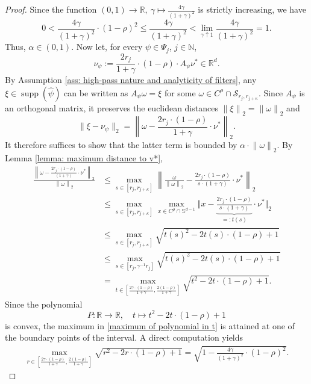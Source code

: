\documentclass[11pt]{amsart}
\newcommand{\R}{{\mathbb{R}}}
\newcommand{\N}{\mathbb{N}}
\newcommand{\s}{\mathcal{S}}
\newcommand{\norm}[1]{\ensuremath{\left\lVert\text{}#1\text{}\right\rVert}}
\DeclareMathOperator{\supp}{supp}
\newenvironment{proof sketch} {\textit{Proof sketch.}}{}
\begin{document}
  \begin{proof}
    Since the function $(0,1)\to \R, \ \gamma \mapsto \frac{4\gamma}{(1+\gamma)^2}$ is strictly increasing, we have
    \[0<\frac{4\gamma}{(1+\gamma)^2}\cdot (1-\rho)^2\leq\frac{4\gamma}{(1+\gamma)^2}<\lim_{\gamma \uparrow 1} \frac{4\gamma}{(1+\gamma)^2}= 1.\] 
    Thus, $\alpha \in (0,1)$.
    Now let, for every $\psi \in \Psi_j$, $j \in \N$,
    \[\nu_{\psi}:=\frac{2r_{j}}{1+\gamma} \cdot (1-\rho)\cdot A_{\psi}\nu^* \in \R^d.\]
    By Assumption \ref{ass: high-pass nature and analyticity of filters}, any $\xi \in \supp(\widehat{\psi})$ can be written as $A_{\psi}\omega = \xi$ for some $\omega \in C^\rho \cap \s_{r_{j},r_{j+\kappa}}$. Since $A_{\psi}$ is an orthogonal matrix, it preserves the euclidean distances $\norm{\xi}_2=\norm{\omega}_2$ and
    \[\|\xi-\nu_{\psi}\|_2=\norm{\omega-\frac{2r_{j} \cdot (1-\rho)}{1+\gamma}\cdot \nu^*}_2.\] 
    It therefore suffices to show that the latter term is bounded by $\alpha \cdot \norm{\omega}_2$. By Lemma \ref{lemma: maximum distance to v*},
    \begin{align}
      \frac{\norm{\omega-\frac{2r_{j} \cdot (1-\rho)}{(1+\gamma)}\cdot \nu^*}_2}{\norm{\omega}_2} 
      &\leq \max_{s \in [r_{j}, r_{j+\kappa}]}\norm{\frac{\omega}{\norm{\omega}_2}-\frac{2r_{j} \cdot (1-\rho)}{s \cdot (1+\gamma)}\cdot \nu^*}_2 \nonumber\\
      &\leq  \max_{s \in [r_{j},r_{j+\kappa}]} \max_{x \in C^\rho \cap \mathbb{S}^{d-1}} \Bigg\Vert x-\underbrace{\frac{2r_{j} \cdot (1-\rho)}{s \cdot (1+\gamma)}}_{=:t(s)}\cdot \nu^*\Bigg\Vert_2 \nonumber\\
      &\leq \max_{s \in [r_{j},r_{j+\kappa}]} \sqrt{t(s)^2-2t(s) \cdot (1-\rho)+1} \nonumber\\
      &\leq \max_{s \in [r_{j},\gamma^{-1}r_{j}]} \sqrt{t(s)^2-2t(s) \cdot (1-\rho) +1} \nonumber\\
      &=\max_{t \in \left[\frac{2\gamma \cdot (1-\rho)}{1+\gamma},\frac{2(1-\rho)}{1+\gamma}\right]} \sqrt{t^2-2t \cdot (1-\rho)+1}. \label{maximum of polynomial in t}
    \end{align}
    Since the polynomial \[P:\R \to \R, \quad t \mapsto t^2-2t \cdot (1-\rho)+1\] is convex, the maximum in \eqref{maximum of polynomial in t} is attained at one of the boundary points of the interval. 
    A direct computation yields
    \begin{align*}
      \max_{r \in \left[\frac{2\gamma \cdot (1-\rho)}{1+\gamma},\frac{2(1-\rho)}{1+\gamma}\right]} \sqrt{r^2-2r \cdot (1-\rho)+1} 
      =\sqrt{1-\frac{4\gamma}{(1+\gamma)^2}\cdot (1-\rho)^2}.
    \end{align*}
  \end{proof}
  
\end{document}
